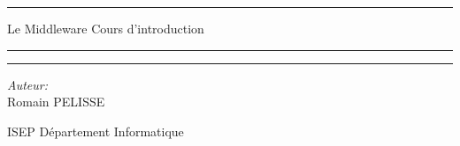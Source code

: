 \begin{titlepage}


\begin{center}
\vspace{20pt}
\hrule
\vspace{3pt}
\begin{center}
{ \huge Le Middleware}
\newline
{ \Large Cours d'introduction}
\end{center}
\vspace{3pt}
\hrule
\vspace{12pt}
\begin{center}


\end{center}
\vfill
\hrule
\vspace{18pt}

\begin{minipage}{0.4\textwidth}
\begin{flushleft} \large
\emph{Auteur:}\\
Romain PELISSE
\end{flushleft}
\end{minipage}
\begin{minipage}{0.4\textwidth}
\begin{flushright} \large
ISEP
\newline
Département Informatique
\end{flushright}
\end{minipage}
\end{center}
\end{titlepage}
